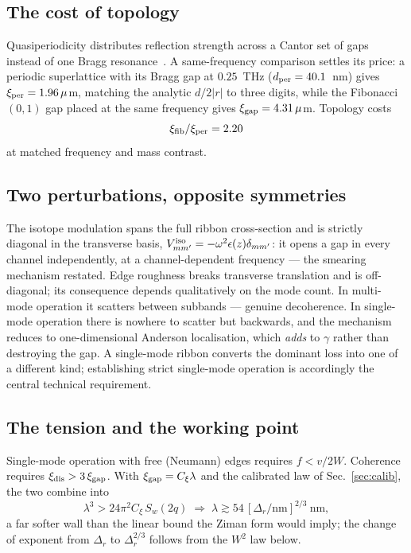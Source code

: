 \documentclass[aps,prl,preprint,superscriptaddress,longbibliography]{revtex4-2}
\begin{document}
\subsection{The cost of topology}

Quasiperiodicity distributes reflection strength across a Cantor set of gaps
instead of one Bragg resonance~\cite{kohmoto1983,merlin1985}. A
same-frequency comparison settles its price: a periodic superlattice with its
Bragg gap at $0.25$~THz ($d_{\rm per} = 40.1$~nm) gives
$\xi_{\rm per} = 1.96\,\mu$m, matching the analytic $d/2|r|$ to three digits,
while the Fibonacci $(0,1)$ gap placed at the same frequency gives
$\xi_{\rm gap} = 4.31\,\mu$m. Topology costs
\begin{equation}
\xi_{\rm fib}/\xi_{\rm per} = 2.20
\end{equation}
at matched frequency and mass contrast.

\subsection{Two perturbations, opposite symmetries}

The isotope modulation spans the full ribbon cross-section and is strictly
diagonal in the transverse basis,
$V^{\rm iso}_{mm'} = -\omega^2\epsilon(z)\delta_{mm'}$: it opens a gap in
every channel independently, at a channel-dependent frequency --- the
smearing mechanism restated. Edge roughness breaks transverse translation
and is off-diagonal; its consequence depends qualitatively on the mode
count. In multi-mode operation it scatters between subbands --- genuine
decoherence. In single-mode operation there is nowhere to scatter but
backwards, and the mechanism reduces to one-dimensional Anderson
localisation, which \emph{adds} to $\gamma$ rather than destroying the gap.
A single-mode ribbon converts the dominant loss into one of a different
kind; establishing strict single-mode operation is accordingly the central
technical requirement.

\subsection{The tension and the working point}
\label{sec:tension}

Single-mode operation with free (Neumann) edges requires $f < v/2W$.
Coherence requires $\xi_{\rm dis} > 3\,\xi_{\rm gap}$. With
$\xi_{\rm gap} = C_\xi\lambda$ and the calibrated law of
Sec.~\ref{sec:calib}, the two combine into
\begin{equation}
\lambda^3 > 24\pi^2 C_\xi\, S_w(2q) \;\Rightarrow\;
\lambda \gtrsim 54\,[\Delta_r/\mathrm{nm}]^{2/3}~\mathrm{nm},
\end{equation}
a far softer wall than the linear bound the Ziman form would imply; the
change of exponent from $\Delta_r$ to $\Delta_r^{2/3}$ follows from the
$W^2$ law below.
\end{document}

